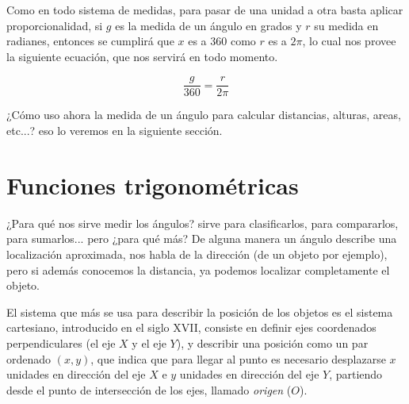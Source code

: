Como en todo sistema de medidas, para pasar de una unidad a otra basta aplicar proporcionalidad, si $g$ es la medida de un ángulo en grados y $r$ su medida en radianes, entonces se cumplirá que $x$ es a $360$ como $r$ es a $2\pi$, lo cual nos provee la siguiente ecuación, que nos servirá en todo momento.

$$\frac{g}{360}=\frac{r}{2\pi}$$

¿Cómo uso ahora la medida de un ángulo para calcular distancias, alturas, areas, etc...? eso lo veremos en la siguiente sección.

\section{Funciones trigonométricas}

¿Para qué nos sirve medir los ángulos? sirve para clasificarlos, para compararlos, para sumarlos... pero ¿para qué más?
De alguna manera un ángulo describe una localización aproximada, nos habla de la dirección (de un objeto por ejemplo), pero si además conocemos la distancia, ya podemos localizar completamente el objeto.

\begin{center}
\end{center}

El sistema que más se usa para describir la posición de los objetos es el sistema cartesiano, introducido en el siglo XVII, consiste en definir ejes coordenados perpendiculares (el eje $X$ y el eje $Y$), y describir una posición como un par ordenado $(x,y)$, que indica que para llegar al punto es necesario desplazarse $x$ unidades en dirección del eje $X$ e $y$ unidades en dirección del eje $Y$, partiendo desde el punto de intersección de los ejes, llamado \emph{origen} ($O$).

